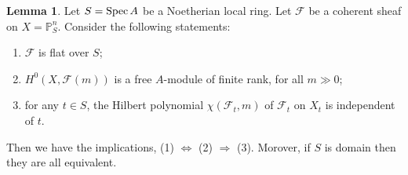 \documentclass[11pt]{amsart}
\newcommand{\Spec}{{\rm Spec \,}}
\newcommand{\sF}{{\mathcal F}}
\renewcommand{\P}{{\mathbb P}}
\theoremstyle{definition}
\newtheorem{lemma}[theorem]{Lemma}
\begin{document}
\begin{lemma}
	\label{lemma-local-ring-hilbert-polynomial-in-flat-family}
	Let $S=\Spec A$ be a Noetherian local ring. Let $\sF$ be a coherent sheaf on $X=\P_S^n$. Consider the following statements:
	\begin{enumerate}
		\item $\sF$ is flat over $S$;
		\item $H^0(X,\sF(m))$ is a free $A$-module of finite rank, for all $m\gg 0$;
		\item for any $t\in S$, the Hilbert polynomial $\chi(\sF_t,m)$ of $\sF_t$ on $X_t$ is independent of $t$.
	\end{enumerate}
	Then we have the implications, (1) $\Leftrightarrow$ (2) $\Rightarrow$ (3). Morover, if $S$ is domain then they are all equivalent.
\end{lemma}
\end{document}
